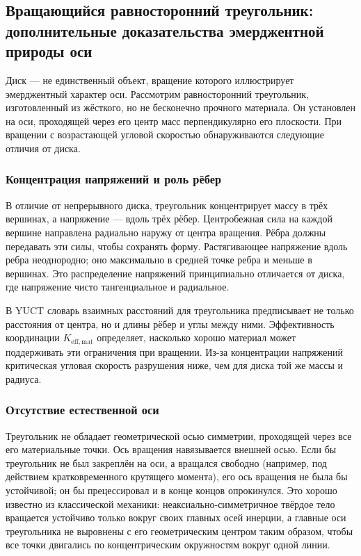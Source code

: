 \documentclass[12pt,a4paper]{article}
\begin{document}
	\subsection{Вращающийся равносторонний треугольник: дополнительные доказательства эмерджентной природы оси}
	
	Диск — не единственный объект, вращение которого иллюстрирует эмерджентный характер оси. Рассмотрим равносторонний треугольник, изготовленный из жёсткого, но не бесконечно прочного материала. Он установлен на оси, проходящей через его центр масс перпендикулярно его плоскости. При вращении с возрастающей угловой скоростью обнаруживаются следующие отличия от диска.
	
	\subsubsection{Концентрация напряжений и роль рёбер}
	
	В отличие от непрерывного диска, треугольник концентрирует массу в трёх вершинах, а напряжение — вдоль трёх рёбер. Центробежная сила на каждой вершине направлена радиально наружу от центра вращения. Рёбра должны передавать эти силы, чтобы сохранять форму. Растягивающее напряжение вдоль ребра неоднородно; оно максимально в средней точке ребра и меньше в вершинах. Это распределение напряжений принципиально отличается от диска, где напряжение чисто тангенциальное и радиальное.
	
	В YUCT словарь взаимных расстояний для треугольника предписывает не только расстояния от центра, но и длины рёбер и углы между ними. Эффективность координации \(K_{\mathrm{eff,mat}}\) определяет, насколько хорошо материал может поддерживать эти ограничения при вращении. Из-за концентрации напряжений критическая угловая скорость разрушения ниже, чем для диска той же массы и радиуса.
	
	\subsubsection{Отсутствие естественной оси}
	
	Треугольник не обладает геометрической осью симметрии, проходящей через все его материальные точки. Ось вращения навязывается внешней осью. Если бы треугольник не был закреплён на оси, а вращался свободно (например, под действием кратковременного крутящего момента), его ось вращения не была бы устойчивой; он бы прецессировал и в конце концов опрокинулся. Это хорошо известно из классической механики: неаксиально-симметричное твёрдое тело вращается устойчиво только вокруг своих главных осей инерции, а главные оси треугольника не выровнены с его геометрическим центром таким образом, чтобы все точки двигались по концентрическим окружностям вокруг одной линии.
	
\end{document}
